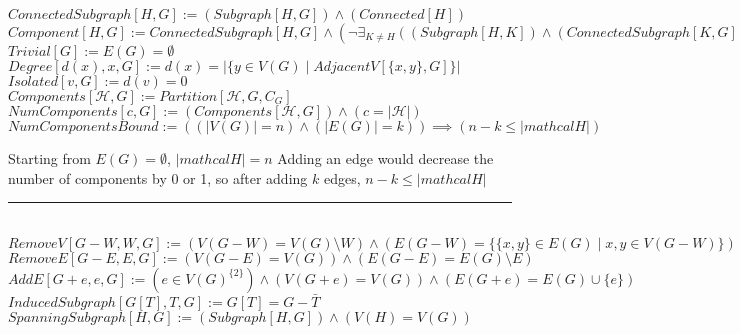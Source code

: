 \documentclass{book}
\newcommand{\abr}{:=}
\newcommand{\st}{\mathbin{|}}
\newcommand{\utup}[1]{\{#1\}}
\begin{document}
$ConnectedSubgraph[H, G] \abr (Subgraph[H, G]) \land (Connected[H])$ \\
$Component[H, G] \abr ConnectedSubgraph[H, G] \land (\lnot \exists_{K \neq H}((Subgraph[H, K]) \land (ConnectedSubgraph[K, G])))$ \\
$Trivial[G] \abr E(G) = \emptyset$ \\
$Degree[d(x), x, G] \abr d(x) = |\{y \in V(G) \st AdjacentV[\utup{x, y}, G]\}|$ \\
$Isolated[v, G] \abr d(v) = 0$ \\

$Components[\mathcal{H}, G] \abr Partition[\mathcal{H}, G, C_G]$ \\
$NumComponents[c, G] \abr (Components[\mathcal{H}, G]) \land (c = |\mathcal{H}|)$ \\
$NumComponentsBound \abr ((|V(G)| = n) \land (|E(G)| = k)) \implies (n - k \leq |mathcal{H}|)$ \\
\begin{enumerate}
  \lit Starting from $E(G) = \emptyset$, $|mathcal{H}| = n$
  \lit Adding an edge would decrease the number of components by 0 or 1, so after adding $k$ edges, $n - k \leq |mathcal{H}|$
\end{enumerate} \vspace{.75mm} \hrule \vspace{.75mm} \ \\ 

$RemoveV[G - W, W, G] \abr (V(G - W) = V(G) \setminus W) \land (E(G - W) = \{\utup{x, y} \in E(G) \st x, y \in V(G - W)\})$ \\
$RemoveE[G - E, E, G] \abr (V(G - E) = V(G)) \land (E(G - E) = E(G) \setminus E)$ \\
$AddE[G + e, e, G] \abr (e \in V(G)^{\{2\}}) \land (V(G + e) = V(G)) \land (E(G + e) = E(G) \cup \{e\})$ \\
$InducedSubgraph[G[T], T, G] \abr G[T] = G - \bar{T}$ \\
$SpanningSubgraph[H, G] \abr (Subgraph[H, G]) \land (V(H) = V(G))$ \\
\end{document}
